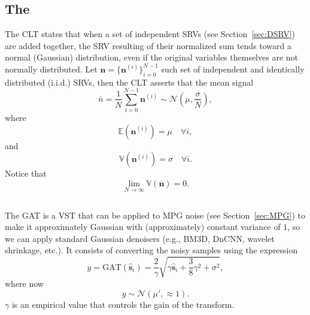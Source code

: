 \chapter{}

\section{The }
\label{sec:CLT}

The \acrshort{CLT} states that when a set of independent \glspl{SRV}
(see Section~\ref{sec:DSRV}) are added together, the \gls{SRV}
resulting of their normalized sum tends toward a normal (Gaussian)
distribution, even if the original variables themselves are not
normally distributed. Let
$\mathbf{n}=\{\mathbf{n}^{(i)}\}_{i=0}^{N-1}$ such set of independent
and identically distributed (i.i.d.) \glspl{SRV}, then the
\acrshort{CLT} asserts that the mean signal
\begin{equation}
  \overline{n} = \frac{1}{N}\sum_{i=0}^{N-1}\mathbf{n}^{(i)}\sim\mathcal{N}(\mu,\frac{\sigma}{N}),
\end{equation}
where
\begin{equation}
  \mathbb{E}(\mathbf{n}^{(i)})=\mu\quad\forall i,
\end{equation}
and
\begin{equation}
  \mathbb{V}(\mathbf{n}^{(i)})=\sigma\quad\forall i.
\end{equation}
Notice that
\begin{equation}
  \lim_{N\rightarrow\infty}\mathbb{V}(\overline{\mathbf{n}}) = 0.
\end{equation}


\section{}
The \acrshort{GAT} \cite{foi2008practical,makitalo2012optimal} is a
\gls{VST} that can be applied to \gls{MPG} noise (see
Section~\ref{sec:MPG}) to make it approximately Gaussian with
(approximately) constant variance of $1$, so we can apply standard
Gaussian denoisers (e.g., \gls{BM3D}, \gls{DnCNN}, wavelet shrinkage,
etc.). It consists of converting the noisy samples using the
expression
\begin{equation}
  y = \text{GAT}(\hat{\mathbf{s}}_i)=\frac{2}{\gamma}\sqrt{\gamma\hat{\mathbf{s}}_i+\frac{3}{8}\gamma^2+\sigma^2},
\end{equation}
where now
\begin{equation}
  y\sim\mathcal{N}(\mu',\approx 1).
\end{equation}
$\gamma$ is an empirical value that controls the gain of the transform.

